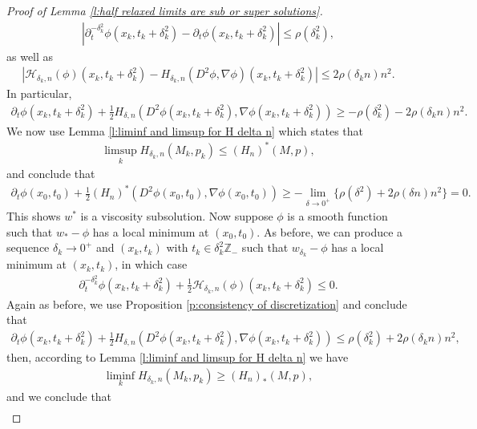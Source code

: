 \documentclass[reqno]{amsart}
\numberwithin{equation}{section}
\begin{document}
\begin{proof}[Proof of Lemma \ref{l:half relaxed limits are sub or super solutions}]
  \begin{align*}
    |\partial_t^{-\delta_k^2}\phi(x_k,t_k+\delta_k^2) - \partial_t\phi(x_k,t_k+\delta_k^2)| \leq \rho(\delta_k^2),  
  \end{align*}
  as well as
  \begin{align*}
    |\mathcal{H}_{\delta_k,n}(\phi)(x_k,t_k+\delta_k^2) - H_{\delta_k,n}(D^2\phi,\nabla \phi)(x_k,t_k+\delta_k^2)| \leq 2\rho(\delta_k n)n^2.  
  \end{align*}
  In particular, 
  \begin{align*}
  \partial_t\phi(x_k,t_k+\delta_k^2)+\tfrac{1}{2}H_{\delta,n}(D^2\phi(x_k,t_k+\delta_k^2),\nabla \phi(x_k,t_k+\delta_k^2)) \geq - \rho(\delta_k^2)-2\rho(\delta_kn)n^2.
  \end{align*}
  We now use Lemma \ref{l:liminf and limsup for H delta n} which states that 
  \begin{align*}
    \limsup_k H_{\delta_k,n}(M_k,p_k) \leq (H_n)^*(M,p),
  \end{align*}
  and conclude that 
  \begin{align*}
    \partial_t\phi(x_0,t_0)+\tfrac{1}{2}(H_n)^*(D^2\phi(x_0,t_0),\nabla \phi(x_0,t_0)) \geq - \lim_{\delta \to 0^+}\{ \rho(\delta^2)+2\rho(\delta n)n^2\} = 0.
  \end{align*}
  This shows $w^*$ is a viscosity subsolution. Now suppose $\phi$ is a smooth function such that $w_*-\phi$ has a local minimum at $(x_0,t_0)$. As before, we can produce a sequence $\delta_k\to 0^+$ and $(x_k,t_k)$ with $t_k \in \delta_k^2\mathbb{Z}_-$ such that $w_{\delta_k}-\phi$ has a local minimum at $(x_k,t_k)$, in which case
  \begin{align*}
    \partial_t^{-\delta_k^2}\phi(x_k,t_k+\delta_k^2) + \tfrac{1}{2}\mathcal{H}_{\delta_k,n}(\phi)(x_k,t_k+\delta_k^2) \leq 0.    
  \end{align*}
  Again as before, we use Proposition \ref{p:consistency of discretization} and conclude that
  \begin{align*}
    \partial_t\phi(x_k,t_k+\delta_k^2)+\tfrac{1}{2}H_{\delta,n}(D^2\phi(x_k,t_k+\delta_k^2),\nabla \phi(x_k,t_k+\delta_k^2)) \leq \rho(\delta_k^2)+2\rho(\delta_kn)n^2,
  \end{align*}
  then, according to Lemma \ref{l:liminf and limsup for H delta n} we have 
    \begin{align*}
    \liminf_k H_{\delta_k,n}(M_k,p_k) \geq (H_n)_*(M,p),
  \end{align*}
  and we conclude that 
  \begin{align*}

\end{align*}
\end{proof}
\end{document}
